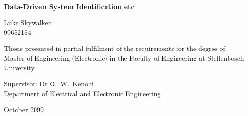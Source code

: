 \graphicspath{{frontmatter/fig/}}

\begin{titlepage}
	\begin{center}
		
		
		
		~\vspace{4.5em}
		
		{\sffamily \bfseries \huge Data-Driven System Identification etc \par}
		
		\vspace{7em}
		
		{\large {\Large  Luke Skywalker} \\ 99652154 \par}
		
		\vspace{8em}
		
		{\large Thesis presented in partial fulfilment of the requirements for the degree of \\ Master of Engineering (Electronic) in the Faculty of Engineering at Stellenbosch University. \par}
		
		\vfill
		
		{\large {Supervisor}: Dr O.\ W.\ Kenobi\\
		Department of Electrical and Electronic Engineering \par}
		
		\vspace{10em}
		
		{\Large October 2099}
	\end{center}
\end{titlepage}
